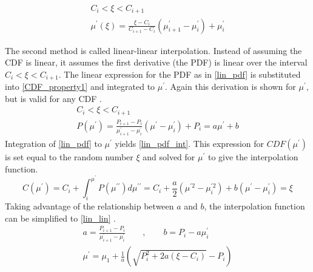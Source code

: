  \begin{equation}
\label{histo_interp}
\begin{gathered}
C_i < \xi < C_{i+1} \\
 \mu^\prime(\xi) = \frac{\xi-C_i}{C_{i+1}-C_i}(\mu^\prime_{i+1}-\mu^\prime_i) + \mu^\prime_i
\end{gathered}
\end{equation}

The second method is called linear-linear interpolation.  Instead of assuming the CDF is linear, it assumes the first derivative (the PDF) is linear over the interval $C_i < \xi < C_{i+1}$.  The linear expression for the PDF as in \eqref{lin_pdf} is substituted into \eqref{CDF_property1} and integrated to $\mu^\prime$.  Again this derivation is shown for $\mu^\prime$, but is valid for any CDF \cite{openmc}.
\begin{equation}
\label{lin_pdf}
\begin{gathered}
C_i < \xi < C_{i+1} \\
P(\mu^\prime) = \frac{P_{i+1}-P_i}{\mu^\prime_{i+1}-\mu^\prime_i}(\mu^\prime - \mu^\prime_i) + P_i = a \mu^\prime + b
\end{gathered}
\end{equation}
%
Integration of \eqref{lin_pdf} to $\mu^\prime$ yields \eqref{lin_pdf_int}.  This expression for $CDF(\mu^\prime)$ is set equal to the random number $\xi$ and solved for $\mu^\prime$ to give the interpolation function.
%
\begin{equation}
\label{lin_pdf_int}
C(\mu^\prime) = C_i  + \int_i^{\mu^\prime} P(\mu^{\prime\prime}) d\mu^{\prime\prime}  = C_i  + \frac{a}{2}(\mu^{\prime 2}-\mu^{\prime 2}_i) + b(\mu^\prime-\mu^\prime_i) = \xi 
\end{equation}
Taking advantage of the relationship between $a$ and $b$, the interpolation function can be simplified to \eqref{lin_lin} \cite{openmc}.
%
\begin{equation}
\label{lin_lin}
\begin{gathered}
a = \frac{P_{i+1}-P_i}{\mu^\prime_{i+1}-\mu^\prime_i} \qquad , \qquad b = P_i - a \mu^\prime_i \\
\mu^\prime = \mu_1 + \frac{1}{a}\left( \sqrt{P^2_i + 2a(\xi -C_i)} -P_i \right)
\end{gathered}
\end{equation}
%


